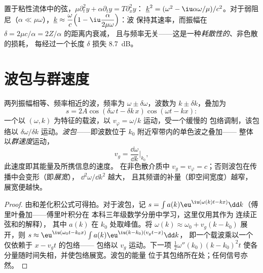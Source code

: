\begin{example}[阻尼弦]\label{ex:b2:dispersion-wave-packets:damped}
置于粘性流体中的弦，$\mu\partial_t^2y + \alpha\partial_ty = T\partial_x^2y$：
$\underline k^2 = (\omega^2 - \iu\alpha\omega/\mu)/c^2$。对于弱阻尼（$\alpha \ll \mu
\omega$），$\underline k \approx \dfrac\omega c\Bigl(1 - \iu\dfrac{\alpha}{2\mu\omega}\Bigr)$：波
保持其速率，而振幅在 $\delta = 2\mu c/\alpha = 2Z/\alpha$ 的距离内衰减，
且与频率无关——这是一种\emph{耗散性的}、非色散的损耗，
每经过一个长度 $\delta$ 损失 \qty{8.7}{dB}。
\end{example}

\section{波包与群速度}

\begin{proposition}[拍；群速度]\label{prop:b2:dispersion-wave-packets:group}
两列振幅相等、频率相近的波，频率为 $\omega \pm
\delta\omega$，波数为 $k \pm \delta k$，叠加为
\[
s = 2A\cos(\delta\omega\,t - \delta k\,x)\cos(\omega t - kx) :
\]
一个以 $(\omega, k)$ 为特征的载波，以 $v_\varphi = \omega/k$ 运动，受一个缓慢的
包络调制，该包络以 $\delta\omega/\delta k$ 运动。\emph{波包}——即波数位于
$k_0$ 附近窄带内的单色波之叠加——
整体以\emph{群速度}运动，
\[
v_g = \frac{\dd\omega}{\dd k}\Bigr|_{k_0} ,
\]
此速度即其能量及所携信息的速度。
在非色散介质中 $v_g = v_\varphi = c$；否则波包在传播中会变形（即\emph{展宽}），
$\dd^2\omega/\dd k^2$ 越大，
且其频谱的补量（即空间宽度）越窄，
展宽便越快。
\end{proposition}

\begin{proof}
由和差化积公式可得拍。对于波包，记 $s =
\int a(k)\eu^{\iu(\omega(k)t - kx)}\dd k$（傅里叶叠加——傅里叶积分在
本科三年级数学分册中学习，这里仅用其作为
连续正弦和的解释），
其中 $a(k)$ 在 $k_0$ 处取峰值。将 $\omega(k) \approx \omega_0 + v_g(k - k_0)$ 展开，则
$s \approx \eu^{\iu(\omega_0t - k_0x)}\int a(k)\eu^{\iu(k - k_0)(v_gt - x)}\dd k$，
即一个载波乘以一个仅依赖于 $x - v_gt$ 的包络——
包络以 $v_g$ 运动。下一项 $\tfrac12\omega''(k_0)(k - k_0)^2t$
使各分量随时间失相，并使包络展宽。波包的能量
位于其包络所在处；任何信号亦然。
\end{proof}

